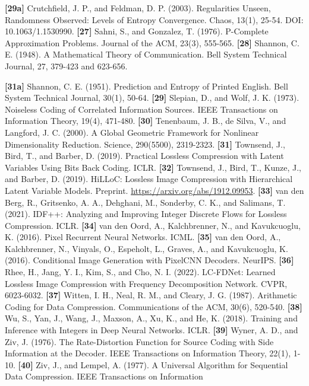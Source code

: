 \documentclass[
]{article}
\begin{document}
\textbf{{[}29a{]}} Crutchfield, J. P., and Feldman, D. P. (2003).
Regularities Unseen, Randomness Observed: Levels of Entropy
Convergence. Chaos, 13(1), 25-54. DOI: 10.1063/1.1530990.
\textbf{{[}27{]}} Sahni, S., and Gonzalez, T. (1976). P-Complete
Approximation Problems. Journal of the ACM, 23(3), 555-565.
\textbf{{[}28{]}} Shannon, C. E. (1948). A Mathematical Theory of
Communication. Bell System Technical Journal, 27, 379-423 and 623-656.

\textbf{{[}31a{]}} Shannon, C. E. (1951). Prediction and Entropy of
Printed English. Bell System Technical Journal, 30(1), 50-64.
\textbf{{[}29{]}} Slepian, D., and Wolf, J. K. (1973). Noiseless Coding
of Correlated Information Sources. IEEE Transactions on Information
Theory, 19(4), 471-480.
\textbf{{[}30{]}} Tenenbaum, J. B., de Silva, V., and Langford, J. C.
(2000). A Global Geometric Framework for Nonlinear Dimensionality
Reduction. Science, 290(5500), 2319-2323.
\textbf{{[}31{]}} Townsend, J., Bird, T., and Barber, D. (2019).
Practical Lossless Compression with Latent Variables Using Bits Back
Coding. ICLR.
\textbf{{[}32{]}} Townsend, J., Bird, T.,
Kunze, J., and Barber, D. (2019). HiLLoC: Lossless Image Compression with
Hierarchical Latent Variable Models. Preprint.
\url{https://arxiv.org/abs/1912.09953}.
\textbf{{[}33{]}} van den Berg, R., Gritsenko, A. A., Dehghani, M.,
Sonderby, C. K., and Salimans, T. (2021). IDF++: Analyzing and Improving
Integer Discrete Flows for Lossless Compression. ICLR.
\textbf{{[}34{]}} van den Oord, A., Kalchbrenner, N., and Kavukcuoglu,
K. (2016). Pixel Recurrent Neural Networks. ICML.
\textbf{{[}35{]}} van den Oord, A., Kalchbrenner, N., Vinyals, O.,
Espeholt, L., Graves, A., and Kavukcuoglu, K. (2016). Conditional Image
Generation with PixelCNN Decoders. NeurIPS.
\textbf{{[}36{]}} Rhee, H., Jang, Y. I., Kim, S., and Cho, N. I. (2022).
LC-FDNet: Learned Lossless Image Compression with Frequency
Decomposition Network. CVPR, 6023-6032.
\textbf{{[}37{]}} Witten, I. H., Neal, R. M., and Cleary, J. G. (1987).
Arithmetic Coding for Data Compression. Communications of the ACM,
30(6), 520-540.
\textbf{{[}38{]}} Wu, S., Yan, J., Wang, J., Maxson, A., Xu, K., and He,
K. (2018). Training and Inference with Integers in Deep Neural Networks.
ICLR.
\textbf{{[}39{]}} Wyner, A. D., and Ziv, J. (1976). The Rate-Distortion
Function for Source Coding with Side Information at the Decoder. IEEE
Transactions on Information Theory, 22(1), 1-10.
\textbf{{[}40{]}} Ziv, J., and Lempel, A. (1977). A Universal Algorithm
for Sequential Data Compression. IEEE Transactions on Information
\end{document}
